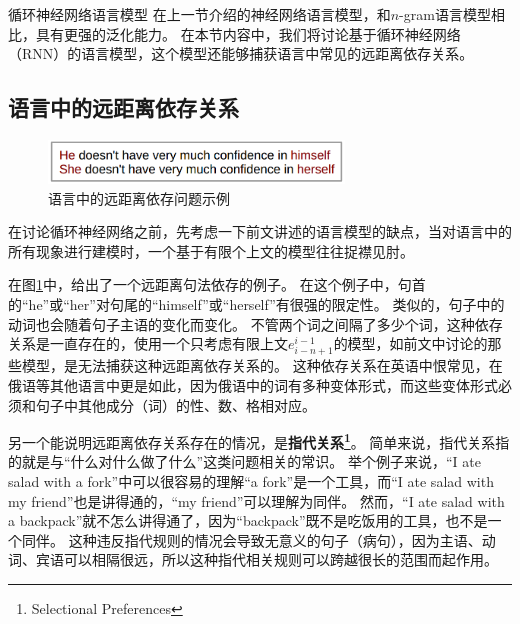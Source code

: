 \documentclass[10pt,a4paper]{ctexart}
\makeatletter
\renewcommand{\section}{\@startsection{section}{1}{0mm}
  {-\baselineskip}{0.5\baselineskip}{\bf\leftline}}
\makeatother
\begin{document}
\begin{enumerate}
\end{enumerate}


\newpage

\section{循环神经网络语言模型}
在上一节介绍的神经网络语言模型，和$n$-gram语言模型相比，具有更强的泛化能力。
在本节内容中，我们将讨论基于循环神经网络（RNN）的语言模型，这个模型还能够捕获语言中常见的远距离依存关系。

\subsection{语言中的远距离依存关系}

\begin{figure}[H]
\centering
\includegraphics[width=0.7\textwidth]{fig14.png}
\caption{语言中的远距离依存问题示例}
\label{fig:14}
\end{figure}

在讨论循环神经网络之前，先考虑一下前文讲述的语言模型的缺点，当对语言中的所有现象进行建模时，一个基于有限个上文的模型往往捉襟见肘。

在图\ref{fig:14}中，给出了一个远距离句法依存的例子。
在这个例子中，句首的“he”或“her”对句尾的“himself”或“herself”有很强的限定性。
类似的，句子中的动词也会随着句子主语的变化而变化。
不管两个词之间隔了多少个词，这种依存关系是一直存在的，使用一个只考虑有限上文$e_{i-n+1}^{i-1}$的模型，如前文中讨论的那些模型，是无法捕获这种远距离依存关系的。
这种依存关系在英语中恨常见，在俄语等其他语言中更是如此，因为俄语中的词有多种变体形式，而这些变体形式必须和句子中其他成分（词）的性、数、格相对应。

另一个能说明远距离依存关系存在的情况，是\textbf{指代关系\footnote{Selectional Preferences}}\cite{resnik1997selectional}。
简单来说，指代关系指的就是与“什么对什么做了什么”这类问题相关的常识。
举个例子来说，“I ate salad with a fork”中可以很容易的理解“a fork”是一个工具，而“I ate salad with my friend”也是讲得通的，“my friend”可以理解为同伴。
然而，“I ate salad with a backpack”就不怎么讲得通了，因为“backpack”既不是吃饭用的工具，也不是一个同伴。
这种违反指代规则的情况会导致无意义的句子（病句），因为主语、动词、宾语可以相隔很远，所以这种指代相关规则可以跨越很长的范围而起作用。
\end{document}
